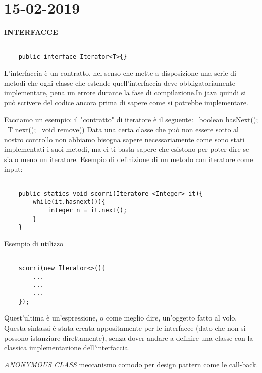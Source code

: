 
 
\newpage
\section{15-02-2019}
\textbf{INTERFACCE}\newline
\begin{lstlisting}[basicstyle=\small,]

	public interface Iterator<T>{}

\end{lstlisting}
L'interfaccia è un contratto, nel senso che mette a disposizione una serie di metodi che ogni classe che estende quell'interfaccia deve obbligatoriamente implementare, pena un errore durante la fase di compilazione.In java quindi si può scrivere del codice ancora prima di sapere come si potrebbe implementare.

\noindent Facciamo un esempio: il "contratto" di iteratore è il seguente: \newline
\textbullet\ boolean hasNext(); \newline
\textbullet\ T next(); \newline
\textbullet\ void remove()\newline
Data una certa classe che può non essere sotto al nostro controllo non abbiamo bisogna sapere necessariamente come sono stati implementati i suoi metodi, ma ci ti basta sapere che esistono per poter dire se sia o meno un iteratore. \newline
Esempio di definizione di un metodo con iteratore come input: 
\begin{lstlisting}[basicstyle=\small,]

	public statics void scorri(Iteratore <Integer> it){
		while(it.hasnext()){
			integer n = it.next();
		}
	}

\end{lstlisting}
Esempio di utilizzo 
\begin{lstlisting}[basicstyle=\small,]

	scorri(new Iterator<>(){
		...
		...
		...
	});

\end{lstlisting}
Quest'ultima è un'espressione, o come meglio dire, un'oggetto fatto al volo. Questa sintassi è stata creata appositamente per le interfacce (dato che non si possono istanziare direttamente), senza dover andare a definire una classe con la classica implementazione dell'interfaccia. 

\noindent \textit{ANONYMOUS CLASS} meccanismo comodo per design pattern come le call-back. 

